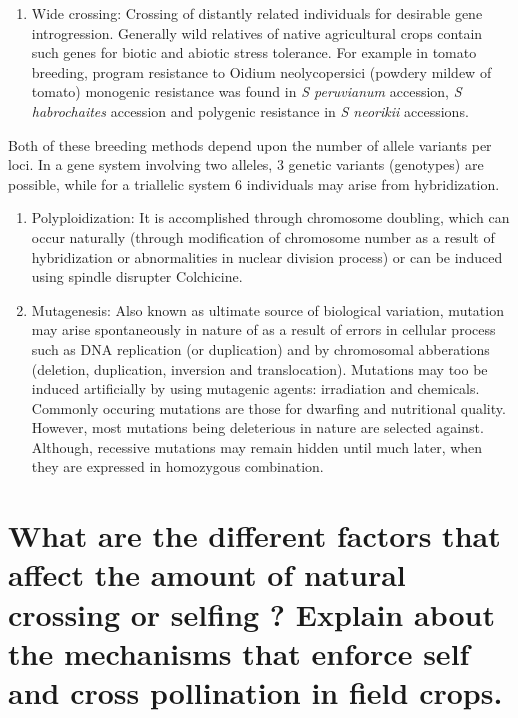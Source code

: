 \documentclass[
  openany]{book}
\providecommand{\tightlist}{%
  \setlength{\itemsep}{0pt}\setlength{\parskip}{0pt}}
\begin{document}
\begin{enumerate}
\def\labelenumi{\arabic{enumi}.}
\setcounter{enumi}{1}
\tightlist
\item
  Wide crossing: Crossing of distantly related individuals for desirable gene introgression. Generally wild relatives of native agricultural crops contain such genes for biotic and abiotic stress tolerance. For example in tomato breeding, program resistance to Oidium neolycopersici (powdery mildew of tomato) monogenic resistance was found in \emph{S peruvianum} accession, \emph{S habrochaites} accession and polygenic resistance in \emph{S neorikii} accessions.
\end{enumerate}

Both of these breeding methods depend upon the number of allele variants per loci. In a gene system involving two alleles, 3 genetic variants (genotypes) are possible, while for a triallelic system 6 individuals may arise from hybridization.

\begin{enumerate}
\def\labelenumi{\arabic{enumi}.}
\setcounter{enumi}{2}
\item
  Polyploidization: It is accomplished through chromosome doubling, which can occur naturally (through modification of chromosome number as a result of hybridization or abnormalities in nuclear division process) or can be induced using spindle disrupter Colchicine.
\item
  Mutagenesis: Also known as ultimate source of biological variation, mutation may arise spontaneously in nature of as a result of errors in cellular process such as DNA replication (or duplication) and by chromosomal abberations (deletion, duplication, inversion and translocation). Mutations may too be induced artificially by using mutagenic agents: irradiation and chemicals. Commonly occuring mutations are those for dwarfing and nutritional quality. However, most mutations being deleterious in nature are selected against. Although, recessive mutations may remain hidden until much later, when they are expressed in homozygous combination.
\end{enumerate}

\hypertarget{what-are-the-different-factors-that-affect-the-amount-of-natural-crossing-or-selfing-explain-about-the-mechanisms-that-enforce-self-and-cross-pollination-in-field-crops.}{%
\section{What are the different factors that affect the amount of natural crossing or selfing ? Explain about the mechanisms that enforce self and cross pollination in field crops.}\label{what-are-the-different-factors-that-affect-the-amount-of-natural-crossing-or-selfing-explain-about-the-mechanisms-that-enforce-self-and-cross-pollination-in-field-crops.}}
\end{document}
